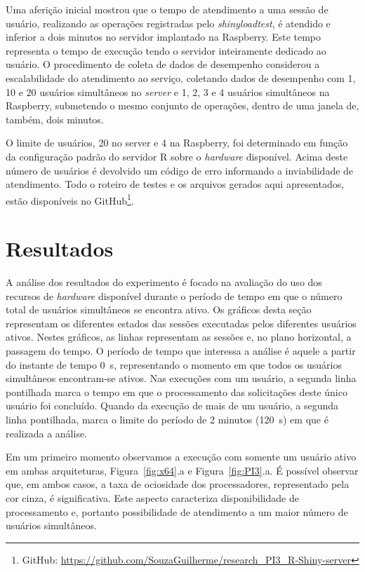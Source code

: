 \documentclass[12pt,english,brazil]{article}
\begin{document}
Uma aferição inicial mostrou que o tempo de atendimento a uma sessão de usuário, realizando as operações registradas pelo \emph{shinyloadtest}, é atendido e inferior a dois minutos no servidor implantado na Raspberry. Este tempo representa o tempo de execução tendo o servidor inteiramente dedicado ao usuário. O procedimento de coleta de dados de desempenho considerou a escalabilidade do atendimento ao serviço, coletando dados de desempenho com 1, 10 e 20 usuários simultâneos no \emph{server} e 1, 2, 3 e 4 usuários simultâneos na Raspberry, submetendo o mesmo conjunto de operações, dentro de uma janela de, também, dois minutos.



O limite de usuários, 20 no server e 4 na Raspberry, foi determinado em função da configuração padrão do servidor R sobre o \emph{hardware} disponível. Acima deste número de usuários é devolvido um código de erro informando a inviabilidade de atendimento. Todo o roteiro de testes e os arquivos gerados aqui apresentados, estão disponíveis no GitHub\footnote{GitHub: \url{https://github.com/SouzaGuilherme/research_PI3_R-Shiny-server}}.

\section{Resultados} \label{sec:Resultados}

A análise dos resultados do experimento é focado na avaliação do uso dos recursos de \emph{hardware} disponível durante o período de tempo em que o número total de usuários simultâneos se encontra ativo. Os gráficos desta seção representam os diferentes estados das sessões executadas pelos diferentes usuários ativos. Nestes gráficos, as linhas representam as sessões e, no plano horizontal, a passagem do tempo. O período de tempo que interessa a análise é aquele a partir do instante de tempo 0~s, representando o momento em que todos os usuários simultâneos encontram-se ativos. Nas execuções com um usuário, a segunda linha pontilhada marca o tempo em que o processamento das solicitações deste único usuário foi concluído. Quando da execução de mais de um usuário, a segunda linha pontilhada, marca o limite do período de 2 minutos (120~s) em que é realizada a análise. 

Em um primeiro momento observamos a execução com somente um usuário ativo em ambas arquiteturas, Figura~\ref{fig:x64}.a e Figura~\ref{fig:PI3}.a. É possível observar que, em ambos casos, a taxa de ociosidade dos processadores, representado pela cor cinza, é significativa. Este aspecto caracteriza disponibilidade de processamento e, portanto possibilidade de atendimento a um maior número de usuários simultâneos. 
\end{document}
